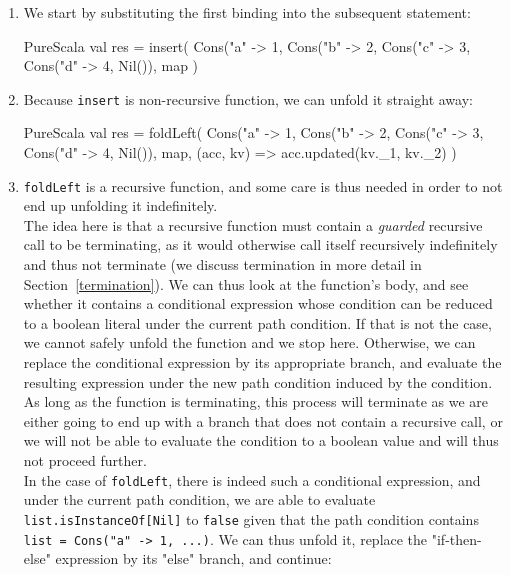 \documentclass[a4paper,twoside]{article}
\newcommand{\RefSec}[1]{Section~\ref{#1}}
\newcommand{\stt}[1]{\texttt{\small{#1}}}
\begin{document}
\begin{enumerate}

\item We start by substituting the first binding into the subsequent statement:

\begin{ShortCode}{PureScala}
val res = insert(
  Cons("a" -> 1, Cons("b" -> 2, Cons("c" -> 3, Cons("d" -> 4, Nil()),
  map
)
\end{ShortCode}

\item Because \stt{insert} is non-recursive function, we can unfold it straight away:

\begin{ShortCode}{PureScala}
val res = foldLeft(
  Cons("a" -> 1, Cons("b" -> 2, Cons("c" -> 3, Cons("d" -> 4, Nil()),
  map,
  (acc, kv) => acc.updated(kv._1, kv._2)
)
\end{ShortCode}

\item \stt{foldLeft} is a recursive function, and some care is thus needed in order to not end up unfolding it indefinitely.\\

The idea here is that a recursive function must contain a \textit{guarded} recursive call to be terminating, as it would otherwise call itself recursively indefinitely and thus not terminate (we discuss termination in more detail in \RefSec{termination}). We can thus look at the function's body, and see whether it contains a conditional expression whose condition can be reduced to a boolean literal under the current path condition. If that is not the case, we cannot safely unfold the function and we stop here. Otherwise, we can replace the conditional expression by its appropriate branch, and evaluate the resulting expression under the new path condition induced by the condition. As long as the function is terminating, this process will terminate as we are either going to end up with a branch that does not contain a recursive call, or we will not be able to evaluate the condition to a boolean value and will thus not proceed further.\\

In the case of \stt{foldLeft}, there is indeed such a conditional expression, and under the current path condition, we are able to evaluate \stt{list.isInstanceOf[Nil]} to \stt{false} given that the path condition contains \stt{list = Cons("a" -> 1, ...)}. We can thus unfold it, replace the "if-then-else" expression by its "else" branch, and continue:


\end{enumerate}
\end{document}
